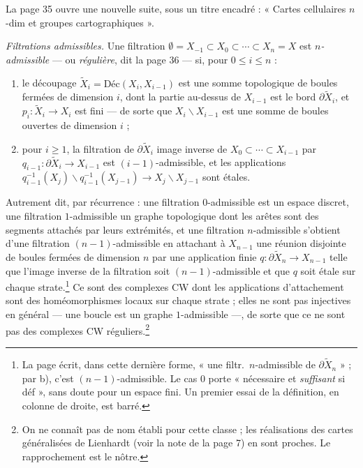 \documentclass[11pt,a4paper]{article}
\begin{document}
La page 35 ouvre une nouvelle suite, sous un titre encadré : « Cartes
cellulaires $n$-dim et groupes cartographiques ».

\emph{Filtrations admissibles.} Une filtration $\emptyset = X_{-1} \subset X_0
\subset \cdots \subset X_n = X$ est \emph{$n$-admissible} --- ou
\emph{régulière}, dit la page 36 --- si, pour $0 \leqslant i \leqslant n$ :
\begin{enumerate}
  \item[a)] le découpage $\widetilde{X}_i = \mathrm{Déc}(X_i, X_{i-1})$ est une
  somme topologique de boules fermées de dimension $i$, dont la partie
  au-dessus de $X_{i-1}$ est le bord $\partial\widetilde{X}_i$, et
  $p_i : \widetilde{X}_i \to X_i$ est fini --- de sorte que $X_i \smallsetminus
  X_{i-1}$ est une somme de boules ouvertes de dimension $i$ ;
  \item[b)] pour $i \geqslant 1$, la filtration de $\partial\widetilde{X}_i$
  image inverse de $X_0 \subset \cdots \subset X_{i-1}$ par $q_{i-1} :
  \partial\widetilde{X}_i \to X_{i-1}$ est $(i-1)$-admissible, et les
  applications $q_{i-1}^{-1}(X_j) \smallsetminus q_{i-1}^{-1}(X_{j-1}) \to X_j
  \smallsetminus X_{j-1}$ sont étales.
\end{enumerate}
Autrement dit, par récurrence : une filtration $0$-admissible est un espace
discret, une filtration $1$-admissible un graphe topologique dont les arêtes
sont des segments attachés par leurs extrémités, et une filtration
$n$-admissible s'obtient d'une filtration $(n-1)$-admissible en attachant à
$X_{n-1}$ une réunion disjointe de boules fermées de dimension $n$ par une
application finie $q : \partial\widetilde{X}_n \to X_{n-1}$ telle que l'image
inverse de la filtration soit $(n-1)$-admissible et que $q$ soit étale sur
chaque strate.\footnote{La page écrit, dans cette dernière forme, « une
filtr.\ $n$-admissible de $\partial\widetilde{X}_n$ » ; par b), c'est
$(n-1)$-admissible. Le cas $0$ porte « nécessaire et \emph{suffisant} si
déf », sans doute pour un espace fini. Un premier essai de la définition, en
colonne de droite, est barré.} Ce sont des complexes CW dont les applications
d'attachement sont des homéomorphismes locaux sur chaque strate ; elles ne
sont pas injectives en général --- une boucle est un graphe $1$-admissible
---, de sorte que ce ne sont pas des complexes CW réguliers.\footnote{On ne
connaît pas de nom établi pour cette classe ; les réalisations des cartes
généralisées de Lienhardt (voir la note de la page 7) en sont proches. Le
rapprochement est le nôtre.}
\end{document}
